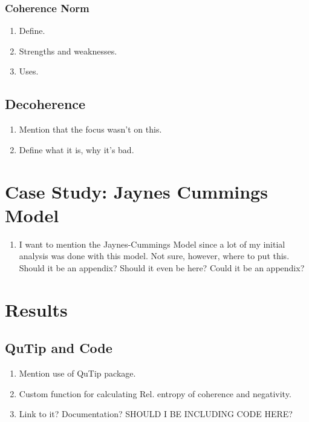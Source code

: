 \documentclass{article}
\begin{document}
\subsubsection{Coherence Norm}
\begin{enumerate}
    \item Define.
    \item Strengths and weaknesses.
    \item Uses.
\end{enumerate}
\subsection{Decoherence}
\begin{enumerate}
    \item Mention that the focus wasn't on this. 
    \item Define what it is, why it's bad. 
\end{enumerate}
\newpage

\section{Case Study: Jaynes Cummings Model}
\begin{enumerate}
    \item I want to mention the Jaynes-Cummings Model since a lot of my initial analysis was done with this model. Not sure, however, where to put this. Should it be an appendix? Should it even be here? Could it be an appendix?
\end{enumerate}
\newpage
\section{Results}
\subsection{QuTip and Code}
\begin{enumerate}
    \item Mention use of QuTip package. 
    \item Custom function for calculating Rel. entropy of coherence and negativity.
    \item Link to it? Documentation? SHOULD I BE INCLUDING CODE HERE?
\end{enumerate}
\end{document}

